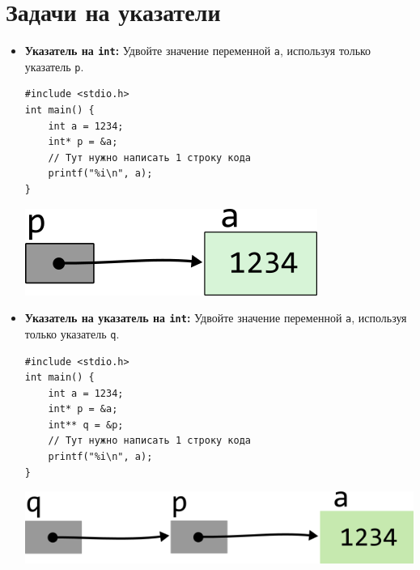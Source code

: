 \documentclass{article}
\begin{document}
\section*{Задачи на указатели}
\begin{itemize}

\item \textbf{Указатель на \texttt{int}:} Удвойте значение переменной \texttt{a}, используя только указатель \texttt{p}.
\begin{multicols}{2}
\begin{lstlisting}
#include <stdio.h>
int main() {
    int a = 1234;
    int* p = &a;
    // Тут нужно написать 1 строку кода
    printf("%i\n", a);
}
\end{lstlisting}

\vfill \null    
\columnbreak
\vfill \null 

\begin{center}
\vspace{1cm} 
\includegraphics[scale=1]{../images/pointer_schemes/pointer_to_int.png}
\end{center}
\end{multicols}


\item \textbf{Указатель на указатель на \texttt{int}:} Удвойте значение переменной \texttt{a}, используя только указатель \texttt{q}.


\begin{multicols}{2}
\begin{lstlisting}
#include <stdio.h>
int main() {
    int a = 1234;
    int* p = &a;
    int** q = &p;
    // Тут нужно написать 1 строку кода
    printf("%i\n", a);
}
\end{lstlisting}
\columnbreak

\hfill \break
\begin{center}
\includegraphics[scale=1]{../images/pointer_schemes/pointer_to_pointer_to_int.png}
\end{center}
\hfill \break


\end{multicols}
\end{itemize}
\end{document}
